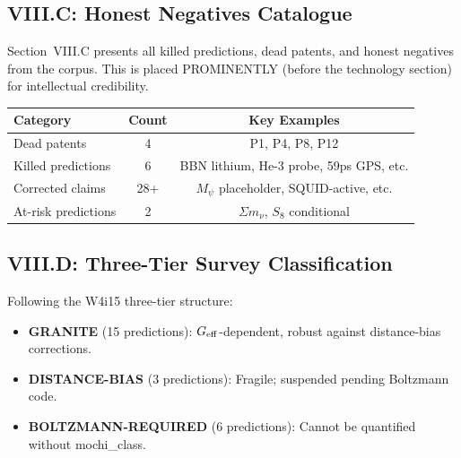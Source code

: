 \documentclass[11pt,a4paper]{article}
\begin{document}
\subsection{VIII.C: Honest Negatives Catalogue}

Section~VIII.C presents all killed predictions, dead patents, and honest negatives from the corpus. This is placed PROMINENTLY (before the technology section) for intellectual credibility.

\begin{center}
\begin{tabular}{lcc}
\toprule
\textbf{Category} & \textbf{Count} & \textbf{Key Examples} \\
\midrule
Dead patents & 4 & P1, P4, P8, P12 \\
Killed predictions & 6 & BBN lithium, He-3 probe, 59ps GPS, etc. \\
Corrected claims & 28+ & $M_\psi$ placeholder, SQUID-active, etc. \\
At-risk predictions & 2 & $\Sigma m_\nu$, $S_8$ conditional \\
\bottomrule
\end{tabular}
\end{center}

\subsection{VIII.D: Three-Tier Survey Classification}

Following the W4i15 three-tier structure:
\begin{itemize}
\item \textbf{GRANITE} (15 predictions): $G_{\rm eff}$-dependent, robust against distance-bias corrections.
\item \textbf{DISTANCE-BIAS} (3 predictions): Fragile; suspended pending Boltzmann code.
\item \textbf{BOLTZMANN-REQUIRED} (6 predictions): Cannot be quantified without mochi\_class.
\end{itemize}
\end{document}
